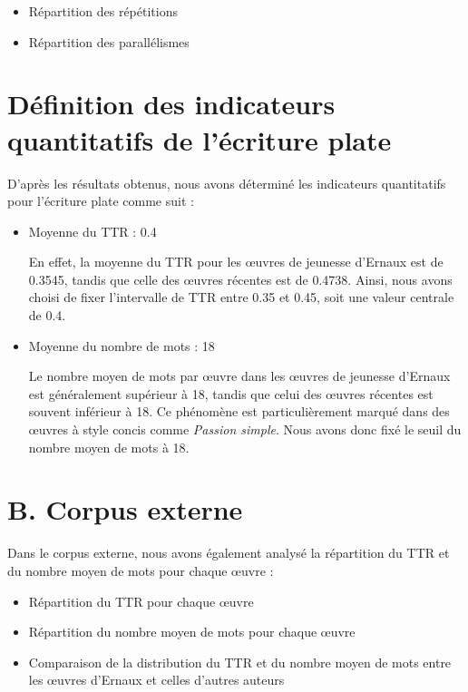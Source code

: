 \begin{itemize}[label=·]
    \item Répartition des répétitions
    \item Répartition des parallélismes
\end{itemize}

\section{Définition des indicateurs quantitatifs de l'écriture plate}

D'après les résultats obtenus, nous avons déterminé les indicateurs quantitatifs pour l'écriture plate comme suit :

\begin{itemize}[label=·]
    \item Moyenne du TTR : 0.4 
    
    En effet, la moyenne du TTR pour les œuvres de jeunesse d'Ernaux est de 0.3545, tandis que celle des œuvres récentes est de 0.4738. Ainsi, nous avons choisi de fixer l'intervalle de TTR entre 0.35 et 0.45, soit une valeur centrale de 0.4.
    
    \item Moyenne du nombre de mots : 18
    
    Le nombre moyen de mots par œuvre dans les œuvres de jeunesse d'Ernaux est généralement supérieur à 18, tandis que celui des œuvres récentes est souvent inférieur à 18. Ce phénomène est particulièrement marqué dans des œuvres à style concis comme \textit{Passion simple}. Nous avons donc fixé le seuil du nombre moyen de mots à 18.
\end{itemize}

\section{B. Corpus externe}

Dans le corpus externe, nous avons également analysé la répartition du TTR et du nombre moyen de mots pour chaque œuvre :

\begin{itemize}[label=·]
    \item Répartition du TTR pour chaque œuvre
    \item Répartition du nombre moyen de mots pour chaque œuvre
    \item Comparaison de la distribution du TTR et du nombre moyen de mots entre les œuvres d'Ernaux et celles d'autres auteurs
\end{itemize}
\newpage

  










